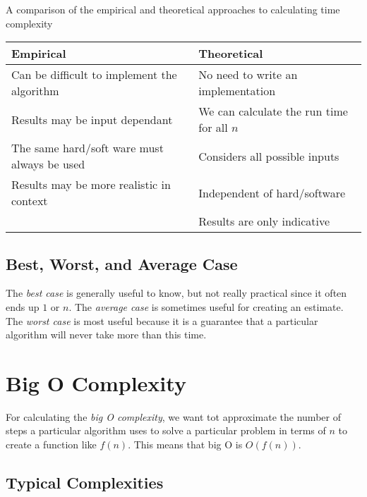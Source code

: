 \begin{highlight}{A comparison of the empirical and theoretical approaches to calculating time complexity}
    \begin{tabular}{p{6cm}p{6cm}}
        Empirical                                   & Theoretical                                 \\
        \midrule
        Can be difficult to implement the algorithm & No need to write an implementation          \\
        \midrule
        Results may be input dependant              & We can calculate the run time for all \(n\) \\
        \midrule
        The same hard/soft ware must always be used & Considers all possible inputs               \\
        \midrule
        Results may be more realistic in context    & Independent of hard/software                \\
        \midrule
                                                    & Results are only indicative                 \\
    \end{tabular}
\end{highlight}

\subsection{Best, Worst, and Average Case}\label{sub:best_worst_and_average_case}

The \emph{best case} is generally useful to know, but not really practical since it often ends up \(1\) or \(n\).
The \emph{average case} is sometimes useful for creating an estimate.
The \emph{worst case} is most useful because it is a guarantee that a particular algorithm will never take more than this time.

\section{Big O Complexity}\label{sec:big_o_complexity}

For calculating the \emph{big O complexity}, we want tot approximate the number of steps a particular algorithm uses to solve a particular problem in terms of \(n\) to create a function like \(f(n)\).
This means that big O is \(O(f(n))\).

\subsection{Typical Complexities}\label{sub:typical_complexities}

